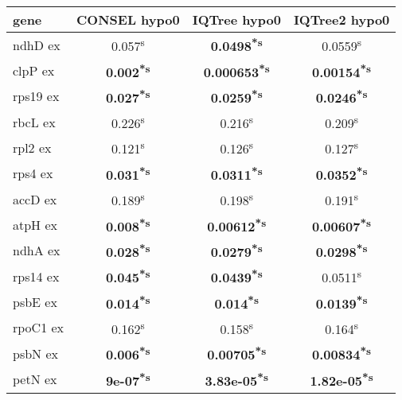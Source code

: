 \documentclass[a4paper]{article}
\begin{document}
\footnotesize
{}
\begin{longtable}{l|c|c|c}
﻿gene&CONSEL hypo0&IQTree hypo0&IQTree2 hypo0\\
\hline
\endhead
ndhD ex&0.057\textsuperscript{s}&\textbf{0.0498\textsuperscript{*}\textsuperscript{s}}&0.0559\textsuperscript{s}\\
clpP ex&\textbf{0.002\textsuperscript{*}\textsuperscript{s}}&\textbf{0.000653\textsuperscript{*}\textsuperscript{s}}&\textbf{0.00154\textsuperscript{*}\textsuperscript{s}}\\
rps19 ex&\textbf{0.027\textsuperscript{*}\textsuperscript{s}}&\textbf{0.0259\textsuperscript{*}\textsuperscript{s}}&\textbf{0.0246\textsuperscript{*}\textsuperscript{s}}\\
rbcL ex&0.226\textsuperscript{s}&0.216\textsuperscript{s}&0.209\textsuperscript{s}\\
rpl2 ex&0.121\textsuperscript{s}&0.126\textsuperscript{s}&0.127\textsuperscript{s}\\
rps4 ex&\textbf{0.031\textsuperscript{*}\textsuperscript{s}}&\textbf{0.0311\textsuperscript{*}\textsuperscript{s}}&\textbf{0.0352\textsuperscript{*}\textsuperscript{s}}\\
accD ex&0.189\textsuperscript{s}&0.198\textsuperscript{s}&0.191\textsuperscript{s}\\
atpH ex&\textbf{0.008\textsuperscript{*}\textsuperscript{s}}&\textbf{0.00612\textsuperscript{*}\textsuperscript{s}}&\textbf{0.00607\textsuperscript{*}\textsuperscript{s}}\\
ndhA ex&\textbf{0.028\textsuperscript{*}\textsuperscript{s}}&\textbf{0.0279\textsuperscript{*}\textsuperscript{s}}&\textbf{0.0298\textsuperscript{*}\textsuperscript{s}}\\
rps14 ex&\textbf{0.045\textsuperscript{*}\textsuperscript{s}}&\textbf{0.0439\textsuperscript{*}\textsuperscript{s}}&0.0511\textsuperscript{s}\\
psbE ex&\textbf{0.014\textsuperscript{*}\textsuperscript{s}}&\textbf{0.014\textsuperscript{*}\textsuperscript{s}}&\textbf{0.0139\textsuperscript{*}\textsuperscript{s}}\\
rpoC1 ex&0.162\textsuperscript{s}&0.158\textsuperscript{s}&0.164\textsuperscript{s}\\
psbN ex&\textbf{0.006\textsuperscript{*}\textsuperscript{s}}&\textbf{0.00705\textsuperscript{*}\textsuperscript{s}}&\textbf{0.00834\textsuperscript{*}\textsuperscript{s}}\\
petN ex&\textbf{9e-07\textsuperscript{*}\textsuperscript{s}}&\textbf{3.83e-05\textsuperscript{*}\textsuperscript{s}}&\textbf{1.82e-05\textsuperscript{*}\textsuperscript{s}}\\

\end{longtable}
\end{document}
